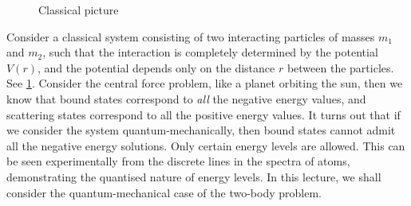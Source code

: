 \documentclass[12pt, a4 paper]{article}
\theoremstyle{definition}
\begin{document}
    \begin{figure}[h]
        \centering
        \caption{Classical picture}\label{fig:twobody}
    \end{figure}
    Consider a classical system consisting of two interacting particles of masses \(m_1\) and \(m_2\), such that the interaction is completely determined by the potential $V(r)$, and the potential depends only on the distance $r$ between the particles. See \cref{fig:twobody}. Consider the central force problem, like a planet orbiting the sun, then we know that bound states correspond to \textit{all} the negative energy values, and scattering states correspond to all the positive energy values. It turns out that if we consider the system quantum-mechanically, then bound states cannot admit all the negative energy solutions. Only certain energy levels are allowed. This can be seen experimentally from the discrete lines in the spectra of atoms, demonstrating the quantised nature of energy levels. In this lecture, we shall consider the quantum-mechanical case of the two-body problem.
\end{document}
